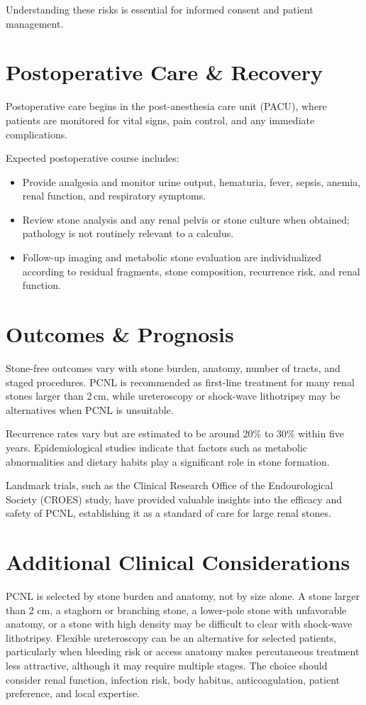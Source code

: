 Understanding these risks is essential for informed consent and patient management.

\section*{Postoperative Care \& Recovery}

Postoperative care begins in the post-anesthesia care unit (PACU), where patients are monitored for vital signs, pain control, and any immediate complications. 

Expected postoperative course includes:

\begin{itemize}
  \item Provide analgesia and monitor urine output, hematuria, fever, sepsis, anemia, renal function, and respiratory symptoms.
  \item Review stone analysis and any renal pelvis or stone culture when obtained; pathology is not routinely relevant to a calculus.
  \item Follow-up imaging and metabolic stone evaluation are individualized according to residual fragments, stone composition, recurrence risk, and renal function.
\end{itemize}

\section*{Outcomes \& Prognosis}

Stone-free outcomes vary with stone burden, anatomy, number of tracts, and staged procedures. PCNL is recommended as first-line treatment for many renal stones larger than 2\,cm, while ureteroscopy or shock-wave lithotripsy may be alternatives when PCNL is unsuitable.

Recurrence rates vary but are estimated to be around 20\% to 30\% within five years. Epidemiological studies indicate that factors such as metabolic abnormalities and dietary habits play a significant role in stone formation.

Landmark trials, such as the Clinical Research Office of the Endourological Society (CROES) study, have provided valuable insights into the efficacy and safety of PCNL, establishing it as a standard of care for large renal stones.

\section*{Additional Clinical Considerations}
PCNL is selected by stone burden and anatomy, not by size alone. A stone larger than 2 cm, a staghorn or branching stone, a lower-pole stone with unfavorable anatomy, or a stone with high density may be difficult to clear with shock-wave lithotripsy. Flexible ureteroscopy can be an alternative for selected patients, particularly when bleeding risk or access anatomy makes percutaneous treatment less attractive, although it may require multiple stages. The choice should consider renal function, infection risk, body habitus, anticoagulation, patient preference, and local expertise.


